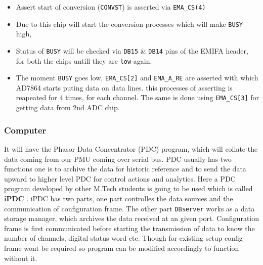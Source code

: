 \begin{itemize}
\item Assert start of conversion (\texttt{CONVST}) is asserted via \texttt{EMA\_CS(4)}
\item Due to this chip will start the conversion processes which will make \texttt{BUSY} high,
\item Status of \texttt{BUSY}  will be checked via \texttt{DB15} \& \texttt{DB14} pins of the EMIFA header, for both the chips untill they are \texttt{low} again.
\item The moment \texttt{BUSY} goes low, \texttt{EMA\_CS[2]} and \texttt{EMA\_A\_RE} are asserted with which AD7864 starts puting data on data lines. this processes of asserting is reapeated for 4 times, for each channel. The same is done using \texttt{EMA\_CS[3]} for getting data from 2nd ADC chip.
\end{itemize}

\subsubsection{Computer}
It will have the Phasor Data Concentrator (PDC) program, which will collate the data coming from our PMU coming over serial bus. PDC  usually has two functions one is to archive the data for historic reference and to send the data upward to higher level PDC for control actions and analytics. Here a PDC program developed by other M.Tech students is going to be used which is called \textbf{iPDC} \cite{site:ipdc}. iPDC has two parts, one part controlles the data sources and the communication of configuration frame. The other part \texttt{DBserver} works as a data storage manager, which archives the data received at an given port. Configuration frame is first communicated before starting the transmission of data to know the number of channels, digital status word etc.
Though for existing setup config frame wont be required so program can be modified accordingly to function without it.